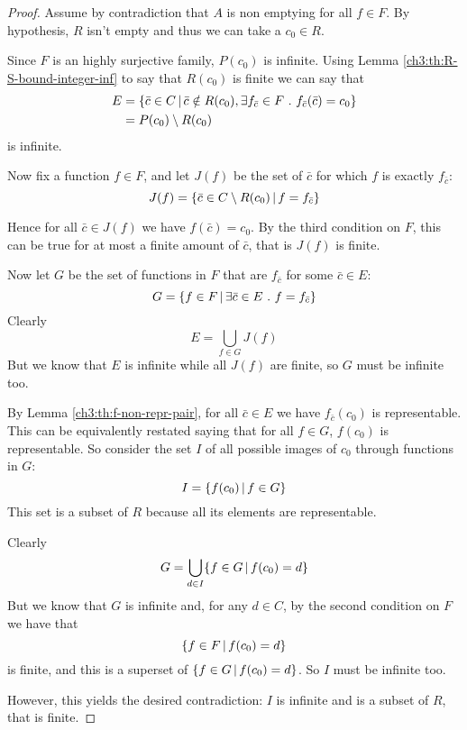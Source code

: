 \begin{proof}
	Assume by contradiction that $A$ is non emptying for all $f \in F$. By hypothesis, $R$ isn't empty and thus we can take a $c_0 \in R$.

	Since $F$ is an highly surjective family, $P(c_0)$ is infinite. Using Lemma \ref{ch3:th:R-S-bound-integer-inf} to say that $R(c_0)$ is finite we can say that
	\begin{align*}
		E &= \{ \bar{c} \in C \,\vert\, \bar{c} \notin R(c_0), \exists f_{\bar{c}} \in F\ .\ f_{\bar{c}}(\bar{c}) = c_0 \} \\
		&= P(c_0) \setminus R(c_0)
	\end{align*}
	is infinite.

	Now fix a function $f \in F$, and let $J(f)$ be the set of $\bar{c}$ for which $f$ is exactly $f_{\bar{c}}$:
	\[
	J(f) = \{ \bar{c} \in C \setminus R(c_0) \,\vert\, f = f_{\bar{c}} \}
	\]

	Hence for all $\bar{c} \in J(f)$ we have $f(\bar{c}) = c_0$. By the third condition on $F$, this can be true for at most a finite amount of $\bar{c}$, that is $J(f)$ is finite.

	Now let $G$ be the set of functions in $F$ that are $f_{\bar{c}}$ for some $\bar{c} \in E$:
	\[
	G = \{ f \in F \,\vert\, \exists \bar{c} \in E\ .\ f = f_{\bar{c}} \}
	\]
	Clearly
	\[
	E = \bigcup\limits_{f \in G} J(f)
	\]
	But we know that $E$ is infinite while all $J(f)$ are finite, so $G$ must be infinite too.

	By Lemma \ref{ch3:th:f-non-repr-pair}, for all $\bar{c} \in E$ we have $f_{\bar{c}}(c_0)$ is representable. This can be equivalently restated saying that for all $f \in G$, $f(c_0)$ is representable.
	So consider the set $I$ of all possible images of $c_0$ through functions in $G$:
	\[
	I = \{ f(c_0) \,\vert\, f \in G \}
	\]
	This set is a subset of $R$ because all its elements are representable.

	Clearly
	\[
	G = \bigcup\limits_{d \in I} \{ f \in G \,\vert\, f(c_0) = d \}
	\]
	But we know that $G$ is infinite and, for any $d \in C$, by the second condition on $F$ we have that
	\[
	\{ f \in F \,\vert\, f(c_0) = d \}
	\]
	is finite, and this is a superset of $\{ f \in G \,\vert\, f(c_0) = d \}$. So $I$ must be infinite too.

	However, this yields the desired contradiction: $I$ is infinite and is a subset of $R$, that is finite.
\end{proof}


